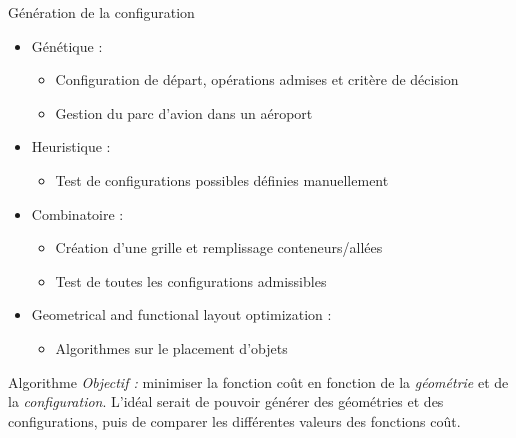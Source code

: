 \begin{frame}{Génération de la configuration}
  \begin{itemize}
  \item Génétique \cite{gotteland2004}:
    \begin{itemize}
    \item Configuration de départ, opérations admises et critère de décision
    \item Gestion du parc d'avion dans un aéroport 
    \end{itemize}
    \vfill
  \item Heuristique \cite{ndiaye2015}:
    \begin{itemize}
    \item Test de configurations possibles définies manuellement
    \end{itemize}
    \vfill
  \item Combinatoire \cite{moussi2012}:
    \begin{itemize}
    \item Création d'une grille et remplissage conteneurs/allées
    \item Test de toutes les configurations admissibles
    \end{itemize}
    \vfill
  \item Geometrical and functional layout optimization \cite{jacquenot2010}:
    \begin{itemize}
    \item Algorithmes sur le placement d'objets
    \end{itemize}
  \end{itemize}
\end{frame}

\begin{frame}{Algorithme}
  \vfill
  \emph{Objectif : } minimiser la fonction coût en fonction de la \emph{géométrie} et de la \emph{configuration}.
  \vfill
  L'idéal serait de pouvoir générer des géométries et des configurations, puis de comparer les différentes valeurs des fonctions coût. 
  \vfill  
\end{frame}

